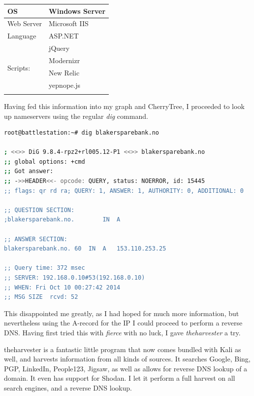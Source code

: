 \begin{table}[h]
\begin{tabular}{|l|l|}
\hline
OS                        & Windows Server \\ \hline
Web Server                & Microsoft IIS  \\ \hline
Language                  & ASP.NET        \\ \hline
\multirow{5}{*}{Scripts:} & jQuery         \\ \cline{2-2} 
                          & Modernizr      \\ \cline{2-2} 
                          & New Relic      \\ \cline{2-2} 
                          & yepnope.js     \\ \cline{2-2} \hline
\end{tabular}
\end{table}

Having fed this information into my graph and CherryTree, I proceeded to look up nameservers using the regular \textit{dig} command.\\

\hspace*{-5in}\begin{lstlisting}[language=bash,caption={dig'ing through DNS}]
root@battlestation:~# dig blakersparebank.no

; <<>> DiG 9.8.4-rpz2+rl005.12-P1 <<>> blakersparebank.no
;; global options: +cmd
;; Got answer:
;; ->>HEADER<<- opcode: QUERY, status: NOERROR, id: 15445
;; flags: qr rd ra; QUERY: 1, ANSWER: 1, AUTHORITY: 0, ADDITIONAL: 0

;; QUESTION SECTION:
;blakersparebank.no.		IN	A

;; ANSWER SECTION:
blakersparebank.no.	60	IN	A	153.110.253.25

;; Query time: 372 msec
;; SERVER: 192.168.0.10#53(192.168.0.10)
;; WHEN: Fri Oct 10 00:27:42 2014
;; MSG SIZE  rcvd: 52

\end{lstlisting}

This disappointed me greatly, as I had hoped for much more information, but nevertheless using the A-record for the IP I could proceed to perform a reverse DNS. Having first tried this with \textit{fierce} with no luck, I gave \textit{theharvester} a try. 

theharvester is a fantastic little program that now comes bundled with Kali as well, and harvests information from all kinds of sources. It searches Google, Bing, PGP, LinkedIn, People123, Jigsaw, as well as allows for reverse DNS lookup of a domain. It even has support for Shodan. I let it perform a full harvest on all search engines, and a reverse DNS lookup.\\

